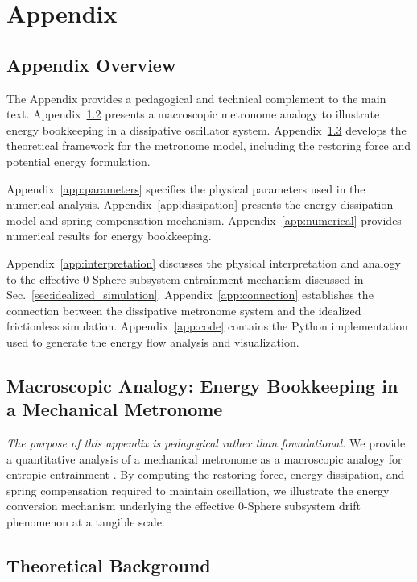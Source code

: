\documentclass[%
 reprint,
 amsmath,amssymb,
 aps,
 prb,
]{revtex4-2}
\numberwithin{equation}{section}
\begin{document}
\section{Appendix}

\subsection{Appendix Overview}
The Appendix provides a pedagogical and technical complement to the main text. Appendix~\ref{app:metronome} presents a macroscopic metronome analogy to illustrate energy bookkeeping in a dissipative oscillator system. Appendix~\ref{app:theory_background} develops the theoretical framework for the metronome model, including the restoring force and potential energy formulation.

Appendix~\ref{app:parameters} specifies the physical parameters used in the numerical analysis. Appendix~\ref{app:dissipation} presents the energy dissipation model and spring compensation mechanism. Appendix~\ref{app:numerical} provides numerical results for energy bookkeeping.

Appendix~\ref{app:interpretation} discusses the physical interpretation and analogy to the effective 0-Sphere subsystem entrainment mechanism discussed in Sec.~\ref{sec:idealized_simulation}. Appendix~\ref{app:connection} establishes the connection between the dissipative metronome system and the idealized frictionless simulation. Appendix~\ref{app:code} contains the Python implementation used to generate the energy flow analysis and visualization.

\subsection{Macroscopic Analogy: Energy Bookkeeping in a Mechanical Metronome}
\label{app:metronome}

\textit{The purpose of this appendix is pedagogical rather than foundational.} We provide a quantitative analysis of a mechanical metronome as a macroscopic analogy for entropic entrainment \cite{Bennett2002}. By computing the restoring force, energy dissipation, and spring compensation required to maintain oscillation, we illustrate the energy conversion mechanism underlying the effective 0-Sphere subsystem drift phenomenon at a tangible scale.

\subsection{Theoretical Background}
\label{app:theory_background}
\end{document}
